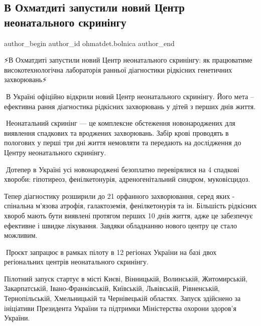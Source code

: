  
 
 
 
 
 
\subsection{В Охматдиті запустили новий Центр неонатального скринінгу}
\label{sec:01_11_2022.fb.ohmatdet.bolnica.1.centr_neonatal_skrining}
 
\ifcmt
 author_begin
   author_id ohmatdet.bolnica
 author_end
\fi

⚡️В Охматдиті запустили новий Центр неонатального скринінгу: як працюватиме
високотехнологічна лабораторія ранньої діагностики рідкісних генетичних
захворювань⚡️

🔻В Україні офіційно відкрили новий Центр неонатального скринінгу. Його мета –
ефективна рання діагностика рідкісних захворювань у дітей з перших днів життя.

🔻Неонатальний скринінг — це комплексне обстеження новонароджених для виявлення
спадкових та вроджених захворювань. Забір крові проводять в пологових у перші
три дні життя немовляти та передають на дослідження до Центру неонатального
скринінгу.

🔻Дотепер в Україні усі новонароджені безоплатно перевірялися на 4 спадкові
хвороби: гіпотиреоз, фенілкетонурія, адреногенітальний синдром, муковісцидоз. 

Тепер діагностику розширили до 21 орфанного захворювання, серед яких  -
спінальна м’язова атрофія, галактоземія, фенілкетонурія та ін. Більшість
рідкісних хвороб мають бути виявлені протягом перших 10 днів життя, адже це
забезпечує ефективне і швидке лікування. Завдяки обладнанню нового центру це
стало можливим. 

🔻Проєкт запрацює в рамках пілоту в 12 регіонах України на базі двох
регіональних центрів неонатального скринінгу.

Пілотний запуск стартує в місті Києві, Вінницькій, Волинській, Житомирській,
Закарпатській, Івано-Франківській, Київській, Львівській, Рівненській,
Тернопільській, Хмельницькій та Чернівецькій областях. Запуск здійснено за
ініціативи Президента України та підтримки Міністерства охорони здоров’я
України. 

